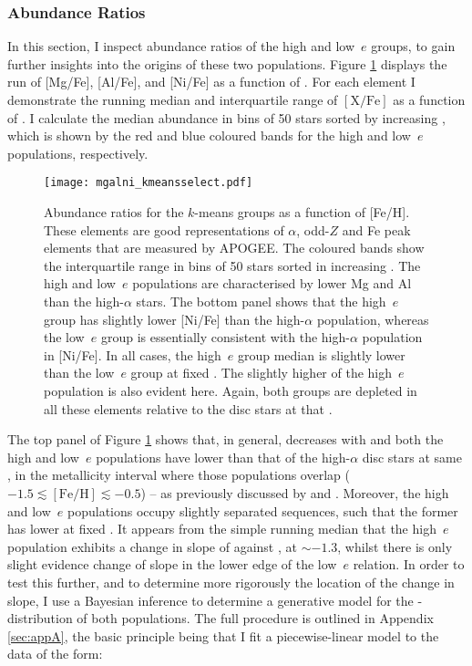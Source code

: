 \subsubsection{Abundance Ratios}
\label{sec:abundances}
 In this section, I inspect abundance ratios of the high and
low~$e$ groups, to gain further insights into the origins of these
two populations.  Figure \ref{fig:mgalni} displays the run of
[Mg/Fe], [Al/Fe], and [Ni/Fe] as a function of \feh{}.  For each
element I demonstrate the running median and interquartile range of
$\mathrm{[X/Fe]}$ as a function of \feh{}. I calculate
the median abundance in bins of 50 stars sorted by increasing \feh{},
which is shown by the red and blue coloured bands for the high and
low~$e$ populations, respectively.

\begin{figure}
\texttt{[image: mgalni\_kmeansselect.pdf]}
\caption[\mgfe{}, \alfe{} and \nife{} abundance ratios of the low and high $e$ $k$-means groups, as a function of \feh{}]{\label{fig:mgalni} Abundance ratios for the $k$-means
groups as a function of [Fe/H]. These elements are good representations
of $\alpha$, odd-$Z$ and Fe peak elements that are measured by
APOGEE. The coloured bands show the interquartile range in bins of
50 stars sorted in increasing \feh{}. The high and low~$e$ populations
are characterised by lower Mg and Al than the high-$\alpha$ stars.
The bottom panel shows that the high~$e$ group has slightly lower
[Ni/Fe] than the high-$\alpha$ population, whereas the low~$e$ group
is essentially consistent with the high-$\alpha$ population in
[Ni/Fe]. In all cases, the high~$e$ group median is slightly lower
than the low~$e$ group at fixed \feh{}. The slightly higher \feh{}
of the high~$e$ population is also evident here.  Again, both groups
are depleted in all these elements relative to the disc stars at
that \feh{}.}
\end{figure}

The top panel of Figure \ref{fig:mgalni} shows that, in general, \mgfe{} decreases with \feh{}
and both the high and low~$e$ populations have \mgfe{} lower than
that of the high-$\alpha$ disc stars at same \feh{}, in the metallicity
interval where those populations overlap
($\mathrm{-1.5\lesssim[Fe/H]\lesssim-0.5}$) -- as previously discussed
by \cite{2018ApJ...852...49H} and \citet{2018ApJ...852...50F}.
Moreover, the high and low~$e$ populations occupy slightly separated
sequences, such that the former has lower \mgfe{} at fixed \feh{}.
It appears from the simple running median that the high~$e$ population
exhibits a change in slope of \mgfe{} against \feh{}, at \feh{}$\sim-1.3$,
whilst there is only slight evidence change of slope in the lower
edge of the low~$e$ relation.  In order to test this further, and
to determine more rigorously the location of the change in slope,
I use a Bayesian inference to determine a generative model for the
\mgfe{}-\feh{} distribution of both populations. The full procedure
is outlined in Appendix \ref{sec:appA}, the basic principle being
that I fit a piecewise-linear model to the data of the form:


